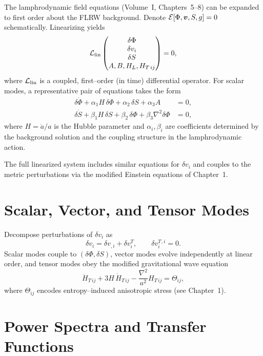 The lamphrodynamic field equations (Volume~I, Chapters~5--8) can be
expanded to first order about the FLRW background.  Denote $\mathcal
E[\Phi,\bm{v},S,g]=0$ schematically.  Linearizing yields
\[
\mathcal L_{\rm lin}
\begin{pmatrix}
\delta\Phi \\
\delta v_i\\
\delta S\\
A,B,H_L,H_{T\,ij}
\end{pmatrix}
=0,
\]
where $\mathcal L_{\rm lin}$ is a coupled, first--order (in time)
differential operator.  For scalar modes, a representative pair of
equations takes the form
\begin{align}
\delta\dot\Phi + \alpha_1 H\,\delta\Phi + \alpha_2\,\delta S
+ \alpha_3 A &= 0, \\
\delta\dot S + \beta_1 H\,\delta S + \beta_2\,\delta\Phi
+ \beta_3\nabla^2\delta\Phi &= 0,
\end{align}
where $H=\dot a/a$ is the Hubble parameter and $\alpha_i,\beta_i$ are
coefficients determined by the background solution and the coupling
structure in the lamphrodynamic action.

The full linearized system includes similar equations for $\delta v_i$
and couples to the metric perturbations via the modified Einstein
equations of Chapter~1.

\section{Scalar, Vector, and Tensor Modes}

Decompose perturbations of $\delta v_i$ as
\begin{equation}
\delta v_i = \delta v_{,i} + \delta v_i^{T},\qquad
\delta v_i^{T}{}^{,i}=0.
\end{equation}
Scalar modes couple to $(\delta\Phi,\delta S)$, vector modes evolve
independently at linear order, and tensor modes obey the modified
gravitational wave equation
\begin{equation}
\label{eq:tensor-eom}
\ddot H_{T\,ij} + 3H\,\dot H_{T\,ij} - \frac{\nabla^2}{a^2}H_{T\,ij}
= \Theta_{ij},
\end{equation}
where $\Theta_{ij}$ encodes entropy--induced anisotropic stress
(see Chapter~1).

\section{Power Spectra and Transfer Functions}

